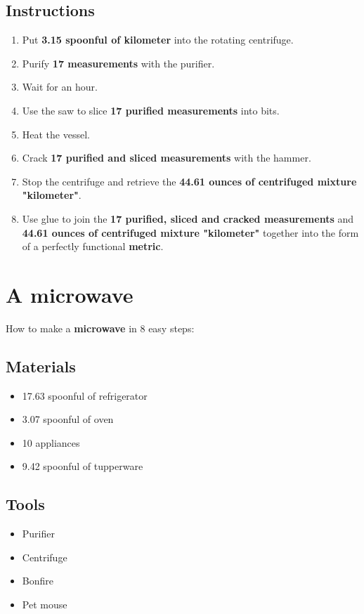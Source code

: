 \documentclass{article}
\begin{document}
\subsection{Instructions}\begin{enumerate}
\item 
Put \textbf{3.15 spoonful of kilometer} into the rotating centrifuge.
\item 
Purify \textbf{17 measurements} with the purifier.
\item 
Wait for an hour.
\item 
Use the saw to slice \textbf{17 purified measurements} into bits.
\item 
Heat the vessel.
\item 
Crack \textbf{17 purified and sliced measurements} with the hammer.
\item 
Stop the centrifuge and retrieve the \textbf{44.61 ounces of centrifuged mixture "kilometer"}.
\item 
Use glue to join the \textbf{17 purified, sliced and cracked measurements} and \textbf{44.61 ounces of centrifuged mixture "kilometer"} together into the form of a perfectly functional \textbf{metric}.
\end{enumerate}
\newpage
\section{A microwave}How to make a \textbf{microwave} in 8 easy steps:

\subsection{Materials}\begin{itemize}
\item 
17.63 spoonful of refrigerator
\item 
3.07 spoonful of oven
\item 
10 appliances
\item 
9.42 spoonful of tupperware
\end{itemize}
\subsection{Tools}\begin{itemize}
\item 
Purifier
\item 
Centrifuge
\item 
Bonfire
\item 
Pet mouse
\end{itemize}
\end{document}
